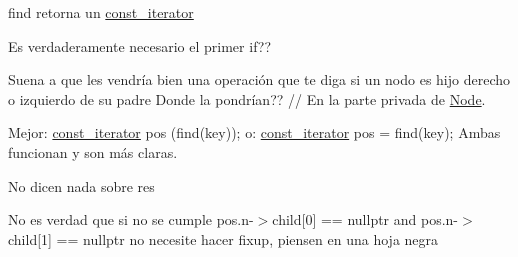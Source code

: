 
\begin{DoxyRefList}
\item[\label{deprecated__deprecated000006}%
\hypertarget{deprecated__deprecated000006}{}%
Miembro \hyperlink{classaed2_1_1map_a0b0a11f906da2926f9eb342fcee79fd7_a0b0a11f906da2926f9eb342fcee79fd7}{aed2\+:\+:map$<$ Key, Meaning, Compare $>$\+:\+:at} (const Key \&key) const ]find retorna un \hyperlink{classaed2_1_1map_1_1const__iterator}{const\+\_\+iterator}  
\item[\label{deprecated__deprecated000017}%
\hypertarget{deprecated__deprecated000017}{}%
Miembro \hyperlink{classaed2_1_1map_a2bfa5165825979bf2431db55bc6bc9ca_a2bfa5165825979bf2431db55bc6bc9ca}{aed2\+:\+:map$<$ Key, Meaning, Compare $>$\+:\+:clear} ()]Es verdaderamente necesario el primer if?? 
\item[\label{deprecated__deprecated000020}%
\hypertarget{deprecated__deprecated000020}{}%
Miembro \hyperlink{classaed2_1_1map_a8fc6c73e0fcd59ae86887300b7287d9f_a8fc6c73e0fcd59ae86887300b7287d9f}{aed2\+:\+:map$<$ Key, Meaning, Compare $>$\+:\+:delete\+Fix\+Up} (\hyperlink{structaed2_1_1map_1_1Node}{Node} $\ast$padre\+\_\+nodo, \hyperlink{structaed2_1_1map_1_1Node}{Node} $\ast$hijo\+\_\+nodo)]Suena a que les vendría bien una operación que te diga si un nodo es hijo derecho o izquierdo de su padre Donde la pondrían?? // En la parte privada de \hyperlink{structaed2_1_1map_1_1Node}{Node}. 
\item[\label{deprecated__deprecated000016}%
\hypertarget{deprecated__deprecated000016}{}%
Miembro \hyperlink{classaed2_1_1map_a2ffadb42cd5f0bc7b3752ff159b75334_a2ffadb42cd5f0bc7b3752ff159b75334}{aed2\+:\+:map$<$ Key, Meaning, Compare $>$\+:\+:erase} (const Key \&key)]Mejor\+: \hyperlink{classaed2_1_1map_1_1const__iterator}{const\+\_\+iterator} pos (find(key)); o\+: \hyperlink{classaed2_1_1map_1_1const__iterator}{const\+\_\+iterator} pos = find(key); Ambas funcionan y son más claras. 
\item[\label{deprecated__deprecated000014}%
\hypertarget{deprecated__deprecated000014}{}%
Miembro \hyperlink{classaed2_1_1map_ad8e796bf9c9c558e5ce6b61e116253fe_ad8e796bf9c9c558e5ce6b61e116253fe}{aed2\+:\+:map$<$ Key, Meaning, Compare $>$\+:\+:erase} (\hyperlink{classaed2_1_1map_1_1const__iterator}{const\+\_\+iterator} pos)]No dicen nada sobre res 

No es verdad que si no se cumple pos.\+n-\/$>$child\mbox{[}0\mbox{]} == nullptr and pos.\+n-\/$>$child\mbox{[}1\mbox{]} == nullptr no necesite hacer fixup, piensen en una hoja negra 


\end{DoxyRefList}
